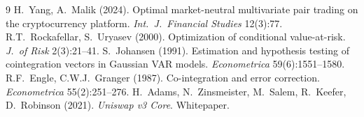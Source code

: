 \documentclass[10pt,a4paper]{article}
\begin{document}
\vspace{-4pt}
\begin{thebibliography}{9}\setlength{\itemsep}{0pt}\small
{} H.~Yang, A.~Malik (2024). Optimal market-neutral multivariate pair trading on the cryptocurrency platform. \emph{Int.\ J.\ Financial Studies} 12(3):77.
 R.T.~Rockafellar, S.~Uryasev (2000). Optimization of conditional value-at-risk. \emph{J.\ of Risk} 2(3):21--41.
 S.~Johansen (1991). Estimation and hypothesis testing of cointegration vectors in Gaussian VAR models. \emph{Econometrica} 59(6):1551--1580.
 R.F.~Engle, C.W.J.~Granger (1987). Co-integration and error correction. \emph{Econometrica} 55(2):251--276.
 H.~Adams, N.~Zinsmeister, M.~Salem, R.~Keefer, D.~Robinson (2021). \emph{Uniswap v3 Core}. Whitepaper.
\end{thebibliography}
\end{document}
